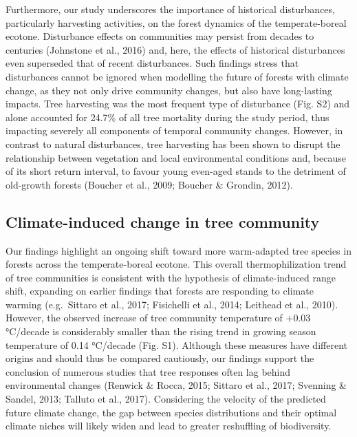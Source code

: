 \documentclass[
  a4paperpaper,
]{article}
\begin{document}
Furthermore, our study underscores the importance of historical
disturbances, particularly harvesting activities, on the forest dynamics
of the temperate-boreal ecotone. Disturbance effects on communities may
persist from decades to centuries (Johnstone et al., 2016) and, here,
the effects of historical disturbances even superseded that of recent
disturbances. Such findings stress that disturbances cannot be ignored
when modelling the future of forests with climate change, as they not
only drive community changes, but also have long-lasting impacts. Tree
harvesting was the most frequent type of disturbance (Fig. S2) and alone
accounted for 24.7\% of all tree mortality during the study period, thus
impacting severely all components of temporal community changes.
However, in contrast to natural disturbances, tree harvesting has been
shown to disrupt the relationship between vegetation and local
environmental conditions and, because of its short return interval, to
favour young even-aged stands to the detriment of old-growth forests
(Boucher et al., 2009; Boucher \& Grondin, 2012).

\hypertarget{climate-induced-change-in-tree-community}{%
\subsection{Climate-induced change in tree
community}\label{climate-induced-change-in-tree-community}}

Our findings highlight an ongoing shift toward more warm-adapted tree
species in forests across the temperate-boreal ecotone. This overall
thermophilization trend of tree communities is consistent with the
hypothesis of climate-induced range shift, expanding on earlier findings
that forests are responding to climate warming (e.g.~Sittaro et al.,
2017; Fisichelli et al., 2014; Leithead et al., 2010). However, the
observed increase of tree community temperature of +0.03 °C/decade is
considerably smaller than the rising trend in growing season temperature
of 0.14 °C/decade (Fig. S1). Although these measures have different
origins and should thus be compared cautiously, our findings support the
conclusion of numerous studies that tree responses often lag behind
environmental changes (Renwick \& Rocca, 2015; Sittaro et al., 2017;
Svenning \& Sandel, 2013; Talluto et al., 2017). Considering the
velocity of the predicted future climate change, the gap between species
distributions and their optimal climate niches will likely widen and
lead to greater reshuffling of biodiversity.
\end{document}
